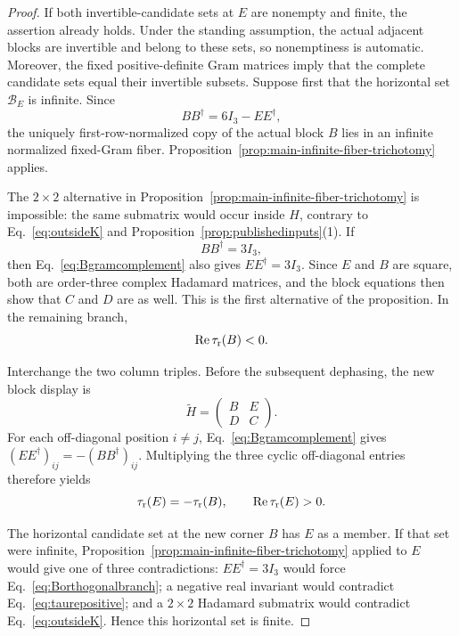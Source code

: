 \documentclass[aps,prx,reprint,nofootinbib,twoside,superscriptaddress,longbibliography,floatfix]{revtex4-2}
\theoremstyle{definition}
\newcommand{\RePart}{\operatorname{Re}}
\begin{document}
\begin{proof}
If both invertible-candidate sets at $E$ are nonempty and finite, the assertion already holds.  Under the standing assumption, the actual adjacent blocks are invertible and belong to these sets, so nonemptiness is automatic. Moreover, the fixed positive-definite Gram matrices imply that the complete candidate sets equal their invertible subsets. Suppose first that the horizontal set $\mathcal B_E$ is infinite.  Since
\begin{equation}
BB^{\dagger}=6I_3-EE^{\dagger},
\label{eq:Bgramcomplement}
\end{equation}
the uniquely first-row-normalized copy of the actual block $B$ lies in an infinite normalized fixed-Gram fiber.  Proposition~\ref{prop:main-infinite-fiber-trichotomy} applies.

The $2\times2$ alternative in Proposition~\ref{prop:main-infinite-fiber-trichotomy} is impossible: the same submatrix would occur inside $H$, contrary to Eq.~\eqref{eq:outsideK} and Proposition~\ref{prop:publishedinputs}(1).  If
\begin{equation}
BB^{\dagger}=3I_3,
\label{eq:Borthogonalbranch}
\end{equation}
then Eq.~\eqref{eq:Bgramcomplement} also gives $EE^{\dagger}=3I_3$.  Since $E$ and $B$ are square, both are order-three complex Hadamard matrices, and the block equations then show that $C$ and $D$ are as well. This is the first alternative of the proposition. In the remaining branch,
\begin{equation}
\RePart\tau_{\rm r}(B)<0.
\label{eq:taurbnegative}
\end{equation}

Interchange the two column triples.  Before the subsequent dephasing, the new block display is
\begin{equation}
\widetilde H=\begin{pmatrix}B&E\\D&C\end{pmatrix}.
\label{eq:columntripleswap}
\end{equation}
For each off-diagonal position $i\neq j$, Eq.~\eqref{eq:Bgramcomplement} gives $(EE^{\dagger})_{ij}=-(BB^{\dagger})_{ij}$.  Multiplying the three cyclic off-diagonal entries therefore yields
\begin{equation}
\tau_{\rm r}(E)=-\tau_{\rm r}(B),
\qquad
\RePart\tau_{\rm r}(E)>0.
\label{eq:taurepositive}
\end{equation}

The horizontal candidate set at the new corner $B$ has $E$ as a member. If that set were infinite, Proposition~\ref{prop:main-infinite-fiber-trichotomy} applied to $E$ would give one of three contradictions: $EE^{\dagger}=3I_3$ would force Eq.~\eqref{eq:Borthogonalbranch}; a negative real invariant would contradict Eq.~\eqref{eq:taurepositive}; and a $2\times2$ Hadamard submatrix would contradict Eq.~\eqref{eq:outsideK}.  Hence this horizontal set is finite.


\end{proof}
\end{document}
